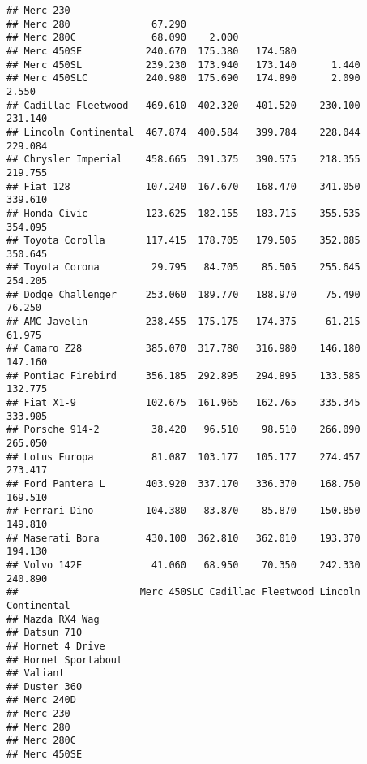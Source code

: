 \documentclass[]{book}
\begin{document}
\begin{verbatim}
## Merc 230                                                             
## Merc 280              67.290                                         
## Merc 280C             68.090    2.000                                
## Merc 450SE           240.670  175.380   174.580                      
## Merc 450SL           239.230  173.940   173.140      1.440           
## Merc 450SLC          240.980  175.690   174.890      2.090      2.550
## Cadillac Fleetwood   469.610  402.320   401.520    230.100    231.140
## Lincoln Continental  467.874  400.584   399.784    228.044    229.084
## Chrysler Imperial    458.665  391.375   390.575    218.355    219.755
## Fiat 128             107.240  167.670   168.470    341.050    339.610
## Honda Civic          123.625  182.155   183.715    355.535    354.095
## Toyota Corolla       117.415  178.705   179.505    352.085    350.645
## Toyota Corona         29.795   84.705    85.505    255.645    254.205
## Dodge Challenger     253.060  189.770   188.970     75.490     76.250
## AMC Javelin          238.455  175.175   174.375     61.215     61.975
## Camaro Z28           385.070  317.780   316.980    146.180    147.160
## Pontiac Firebird     356.185  292.895   294.895    133.585    132.775
## Fiat X1-9            102.675  161.965   162.765    335.345    333.905
## Porsche 914-2         38.420   96.510    98.510    266.090    265.050
## Lotus Europa          81.087  103.177   105.177    274.457    273.417
## Ford Pantera L       403.920  337.170   336.370    168.750    169.510
## Ferrari Dino         104.380   83.870    85.870    150.850    149.810
## Maserati Bora        430.100  362.810   362.010    193.370    194.130
## Volvo 142E            41.060   68.950    70.350    242.330    240.890
##                     Merc 450SLC Cadillac Fleetwood Lincoln Continental
## Mazda RX4 Wag                                                         
## Datsun 710                                                            
## Hornet 4 Drive                                                        
## Hornet Sportabout                                                     
## Valiant                                                               
## Duster 360                                                            
## Merc 240D                                                             
## Merc 230                                                              
## Merc 280                                                              
## Merc 280C                                                             
## Merc 450SE                                                            

\end{verbatim}
\end{document}
